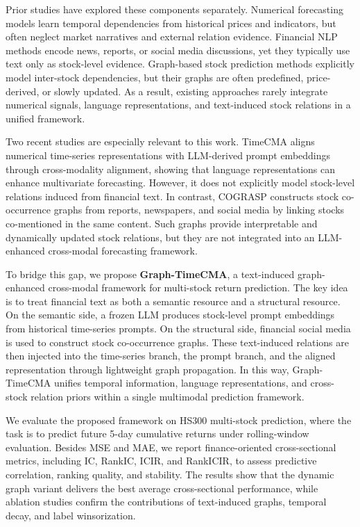 \documentclass[11pt]{article}
\begin{document}
Prior studies have explored these components separately. Numerical forecasting models learn temporal dependencies from historical prices and indicators, but often neglect market narratives and external relation evidence. Financial NLP methods encode news, reports, or social media discussions, yet they typically use text only as stock-level evidence. Graph-based stock prediction methods explicitly model inter-stock dependencies, but their graphs are often predefined, price-derived, or slowly updated. As a result, existing approaches rarely integrate numerical signals, language representations, and text-induced stock relations in a unified framework.

Two recent studies are especially relevant to this work. TimeCMA aligns numerical time-series representations with LLM-derived prompt embeddings through cross-modality alignment, showing that language representations can enhance multivariate forecasting. However, it does not explicitly model stock-level relations induced from financial text. In contrast, COGRASP constructs stock co-occurrence graphs from reports, newspapers, and social media by linking stocks co-mentioned in the same content. Such graphs provide interpretable and dynamically updated stock relations, but they are not integrated into an LLM-enhanced cross-modal forecasting framework.

To bridge this gap, we propose \textbf{Graph-TimeCMA}, a text-induced graph-enhanced cross-modal framework for multi-stock return prediction. The key idea is to treat financial text as both a semantic resource and a structural resource. On the semantic side, a frozen LLM produces stock-level prompt embeddings from historical time-series prompts. On the structural side, financial social media is used to construct stock co-occurrence graphs. These text-induced relations are then injected into the time-series branch, the prompt branch, and the aligned representation through lightweight graph propagation. In this way, Graph-TimeCMA unifies temporal information, language representations, and cross-stock relation priors within a single multimodal prediction framework.

We evaluate the proposed framework on HS300 multi-stock prediction, where the task is to predict future 5-day cumulative returns under rolling-window evaluation. Besides MSE and MAE, we report finance-oriented cross-sectional metrics, including IC, RankIC, ICIR, and RankICIR, to assess predictive correlation, ranking quality, and stability. The results show that the dynamic graph variant delivers the best average cross-sectional performance, while ablation studies confirm the contributions of text-induced graphs, temporal decay, and label winsorization.
\end{document}
